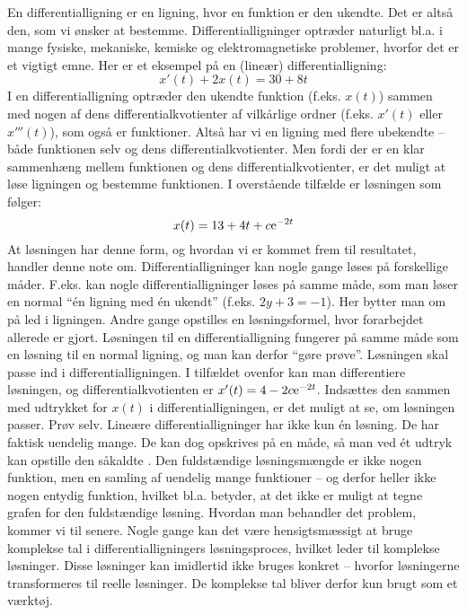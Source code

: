 \begin{explain} \label{hvad.diff21}
En differentialligning er en ligning, hvor en funktion er den ukendte. Det er altså den, som vi ønsker at bestemme. Differentialligninger optræder naturligt bl.a. i mange fysiske, mekaniske, kemiske og elektromagnetiske problemer, hvorfor det er et vigtigt emne. Her er et eksempel på en (lineær) differentialligning:
\begin{equation}
x'(t) + 2x(t) = 30 + 8t
\end{equation}
I en differentialligning optræder den ukendte funktion (f.eks. $ x(t) $) sammen med nogen af dens differentialkvotienter af vilkårlige ordner (f.eks. $ x'(t) $ eller $ x'''(t) $), som også er funktioner. Altså har vi en ligning med flere ubekendte -- både funktionen selv og dens differentialkvotienter. Men fordi der er en klar sammenhæng mellem funktionen og dens differentialkvotienter, er det muligt at løse ligningen og bestemme funktionen. I overstående tilfælde er løsningen som følger:
\begin{equation}
x(t) = 13 + 4t + c \mathrm{e}^{-2t}
\end{equation}
At løsningen har denne form, og hvordan vi er kommet frem til resultatet, handler denne note om.\bs
Differentialligninger kan nogle gange løses på forskellige måder. F.eks. kan nogle differentialligninger løses på samme måde, som man løser en normal ``én ligning med én ukendt'' (f.eks. $ 2y + 3 = -1 $). Her bytter man om på led i ligningen. Andre gange opstilles en løsningsformel, hvor forarbejdet allerede er gjort. \bs
Løsningen til en differentialligning fungerer på samme måde som en løsning til en normal ligning, og man kan derfor ``gøre prøve''. Løsningen skal passe ind i differentialligningen. I tilfældet ovenfor kan man differentiere løsningen, og differentialkvotienten er $ x'(t) = 4 - 2c \mathrm{e}^{-2t} $. Indsættes den sammen med udtrykket for $ x(t) $ i differentialligningen, er det muligt at se, om løsningen passer. Prøv selv. \bs
Lineære differentialligninger har ikke kun én løsning. De har faktisk uendelig mange. De kan dog opskrives på en måde, så man ved ét udtryk kan opstille den såkaldte . Den fuldstændige løsningsmængde er ikke nogen funktion, men en samling af uendelig mange funktioner -- og derfor heller ikke nogen entydig funktion, hvilket bl.a. betyder, at det ikke er muligt at tegne grafen for den fuldstændige løsning. Hvordan man behandler det problem, kommer vi til senere. \bs
Nogle gange kan det være hensigtsmæssigt at bruge komplekse tal i differentialligningers løsningsproces, hvilket leder til komplekse løsninger. Disse løsninger kan imidlertid ikke bruges konkret -- hvorfor løsningerne transformeres til reelle løsninger. De komplekse tal bliver derfor kun brugt som et værktøj.
\end{explain}

